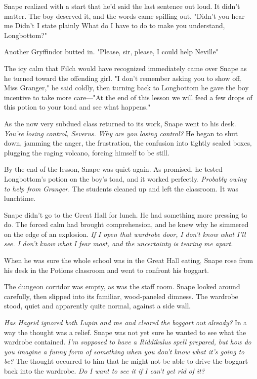 Snape realized with a start that he'd said the last sentence out loud. It didn't matter. The boy deserved it, and the words came spilling out. "Didn't you hear me{\el} Didn't I state plainly{\el} What do I have to do to make you understand, Longbottom?"

Another Gryffindor butted in. "Please, sir, please, I could help Neville{\el}"

The icy calm that Filch would have recognized immediately came over Snape as he turned toward the offending girl. "I don't remember asking you to show off, Miss Granger," he said coldly, then turning back to Longbottom he gave the boy incentive to take more care—"At the end of this lesson we will feed a few drops of this potion to your toad and see what happens."

As the now very subdued class returned to its work, Snape went to his desk. \emph{You're losing control, Severus. Why are you losing control?} He began to shut down, jamming the anger, the frustration, the confusion into tightly sealed boxes, plugging the raging volcano, forcing himself to be still.

By the end of the lesson, Snape was quiet again. As promised, he tested Longbottom's potion on the boy's toad, and it worked perfectly. \emph{Probably owing to help from Granger.} The students cleaned up and left the classroom. It was lunchtime.

Snape didn't go to the Great Hall for lunch. He had something more pressing to do. The forced calm had brought comprehension, and he knew why he simmered on the edge of an explosion. \emph{If I open that wardrobe door, I don't know what I'll see. I don't know what I fear most, and the uncertainty is tearing me apart.}

When he was sure the whole school was in the Great Hall eating, Snape rose from his desk in the Potions classroom and went to confront his boggart.

The dungeon corridor was empty, as was the staff room. Snape looked around carefully, then slipped into its familiar, wood-paneled dimness. The wardrobe stood, quiet and apparently quite normal, against a side wall.

\emph{Has Hagrid ignored both Lupin and me and cleared the boggart out already?} In a way the thought was a relief. Snape was not yet sure he wanted to see what the wardrobe contained. \emph{I'm supposed to have a Riddikulus spell prepared, but how do you imagine a funny form of something when you don't know what it's going to be?} The thought occurred to him that he might not be able to drive the boggart back into the wardrobe. \emph{Do I want to see it if I can't get rid of it?}

